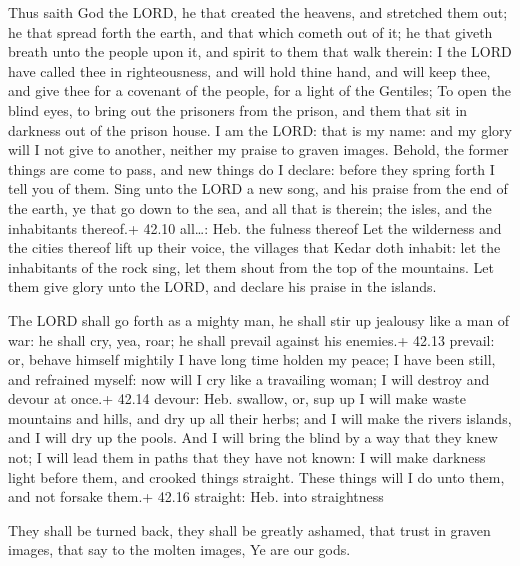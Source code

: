  Thus saith God the LORD, he that created the heavens, and
stretched them out; he that spread forth the earth, and that which
cometh out of it; he that giveth breath unto the people upon it, and
spirit to them that walk therein:  I the LORD have called
thee in righteousness, and will hold thine hand, and will keep thee, and
give thee for a covenant of the people, for a light of the Gentiles;
 To open the blind eyes, to bring out the prisoners from the
prison, and them that sit in darkness out of the prison house.
 I am the LORD: that is my name: and my glory will I not
give to another, neither my praise to graven images. 
Behold, the former things are come to pass, and new things do I declare:
before they spring forth I tell you of them.  Sing unto the
LORD a new song, and his praise from the end of the earth, ye that go
down to the sea, and all that is therein; the isles, and the inhabitants
thereof.+ 42.10 all\ldots: Heb. the fulness thereof  Let
the wilderness and the cities thereof lift up their voice, the villages
that Kedar doth inhabit: let the inhabitants of the rock sing, let them
shout from the top of the mountains.  Let them give glory
unto the LORD, and declare his praise in the islands.

 The LORD shall go forth as a mighty man, he shall stir up
jealousy like a man of war: he shall cry, yea, roar; he shall prevail
against his enemies.+ 42.13 prevail: or, behave himself mightily
 I have long time holden my peace; I have been still, and
refrained myself: now will I cry like a travailing woman; I will destroy
and devour at once.+ 42.14 devour: Heb. swallow, or, sup up
 I will make waste mountains and hills, and dry up all
their herbs; and I will make the rivers islands, and I will dry up the
pools.  And I will bring the blind by a way that they knew
not; I will lead them in paths that they have not known: I will make
darkness light before them, and crooked things straight. These things
will I do unto them, and not forsake them.+ 42.16 straight: Heb. into
straightness

 They shall be turned back, they shall be greatly
ashamed, that trust in graven images, that say to the molten images, Ye
are our gods.

